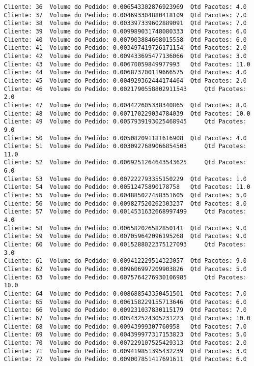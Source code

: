 \documentclass[11pt]{article}
\begin{document}
\begin{Verbatim}[commandchars=\\\{\}]
Cliente: 36	 Volume do Pedido: 0.006543302876923969	 Qtd Pacotes: 4.0
Cliente: 37	 Volume do Pedido: 0.004693304880418109	 Qtd Pacotes: 7.0
Cliente: 38	 Volume do Pedido: 0.003397339602889091	 Qtd Pacotes: 7.0
Cliente: 39	 Volume do Pedido: 0.009989031748080333	 Qtd Pacotes: 6.0
Cliente: 40	 Volume do Pedido: 0.007903884668015558	 Qtd Pacotes: 6.0
Cliente: 41	 Volume do Pedido: 0.003497419726171154	 Qtd Pacotes: 2.0
Cliente: 42	 Volume do Pedido: 0.009433695477136066	 Qtd Pacotes: 3.0
Cliente: 43	 Volume do Pedido: 0.00670059849977993	 Qtd Pacotes: 11.0
Cliente: 44	 Volume do Pedido: 0.006873700119666575	 Qtd Pacotes: 4.0
Cliente: 45	 Volume do Pedido: 0.004929362444174464	 Qtd Pacotes: 2.0
Cliente: 46	 Volume do Pedido: 0.0021790558802911543	 Qtd Pacotes: 2.0
Cliente: 47	 Volume do Pedido: 0.004422605338340865	 Qtd Pacotes: 8.0
Cliente: 48	 Volume do Pedido: 0.007170229034784039	 Qtd Pacotes: 10.0
Cliente: 49	 Volume do Pedido: 0.0057939193025468945	 Qtd Pacotes: 9.0
Cliente: 50	 Volume do Pedido: 0.005082091181616908	 Qtd Pacotes: 4.0
Cliente: 51	 Volume do Pedido: 0.0030927689066854503	 Qtd Pacotes: 11.0
Cliente: 52	 Volume do Pedido: 0.0069251264643543625	 Qtd Pacotes: 6.0
Cliente: 53	 Volume do Pedido: 0.007222793355150229	 Qtd Pacotes: 1.0
Cliente: 54	 Volume do Pedido: 0.00512475890178758	 Qtd Pacotes: 11.0
Cliente: 55	 Volume do Pedido: 0.004885027458351605	 Qtd Pacotes: 5.0
Cliente: 56	 Volume do Pedido: 0.009827520262303237	 Qtd Pacotes: 8.0
Cliente: 57	 Volume do Pedido: 0.0014531632668997499	 Qtd Pacotes: 4.0
Cliente: 58	 Volume do Pedido: 0.006582026582850141	 Qtd Pacotes: 9.0
Cliente: 59	 Volume do Pedido: 0.007059642096195268	 Qtd Pacotes: 9.0
Cliente: 60	 Volume do Pedido: 0.0015288022375127093	 Qtd Pacotes: 3.0
Cliente: 61	 Volume do Pedido: 0.009412229514323057	 Qtd Pacotes: 9.0
Cliente: 62	 Volume do Pedido: 0.009606997209903826	 Qtd Pacotes: 5.0
Cliente: 63	 Volume do Pedido: 0.0075764276930106985	 Qtd Pacotes: 10.0
Cliente: 64	 Volume do Pedido: 0.008688543350451501	 Qtd Pacotes: 7.0
Cliente: 65	 Volume do Pedido: 0.006158229155713646	 Qtd Pacotes: 6.0
Cliente: 66	 Volume do Pedido: 0.009231037830115179	 Qtd Pacotes: 7.0
Cliente: 67	 Volume do Pedido: 0.005432524305231223	 Qtd Pacotes: 10.0
Cliente: 68	 Volume do Pedido: 0.00943999307760958	 Qtd Pacotes: 7.0
Cliente: 69	 Volume do Pedido: 0.004399977317153823	 Qtd Pacotes: 5.0
Cliente: 70	 Volume do Pedido: 0.007229107525429313	 Qtd Pacotes: 2.0
Cliente: 71	 Volume do Pedido: 0.009419851395432239	 Qtd Pacotes: 3.0
Cliente: 72	 Volume do Pedido: 0.009007851417691611	 Qtd Pacotes: 6.0

\end{Verbatim}
\end{document}
